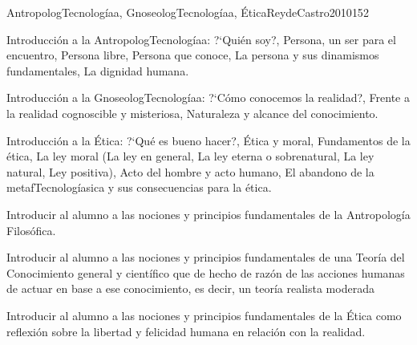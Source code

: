 \begin{syllabus}
\begin{unit}{AntropologTecnologíaa, GnoseologTecnologíaa, Ética}{ReydeCastro2010}{15}{2}
\begin{topics}
	\item Introducción a la AntropologTecnologíaa: ?`Quién soy?, Persona, un ser para el encuentro, Persona libre, Persona que conoce, La persona y sus dinamismos fundamentales, La dignidad humana.
	\item Introducción a la GnoseologTecnologíaa: ?`Cómo conocemos la realidad?, Frente a la realidad cognoscible y misteriosa, Naturaleza y alcance del conocimiento.
	\item Introducción a la Ética: ?`Qué es bueno hacer?, Ética y moral, Fundamentos de la ética, La ley moral (La ley en general, La ley eterna o sobrenatural, La ley natural, Ley positiva), Acto del hombre y acto humano, El abandono de la metafTecnologíasica y sus consecuencias para la ética.
\end{topics}

\begin{learningoutcomes}
	\item Introducir al alumno a las nociones y principios fundamentales de la Antropología Filosófica.
	\item Introducir al alumno a las nociones y principios fundamentales de una Teoría del Conocimiento general y científico que de hecho de razón de las acciones humanas de actuar en base a ese conocimiento, es decir, un teoría realista moderada
	\item Introducir al alumno a las nociones y principios fundamentales de la Ética como reflexión sobre la libertad y felicidad humana en relación con la realidad.
\end{learningoutcomes}
\end{unit}


\end{syllabus}

